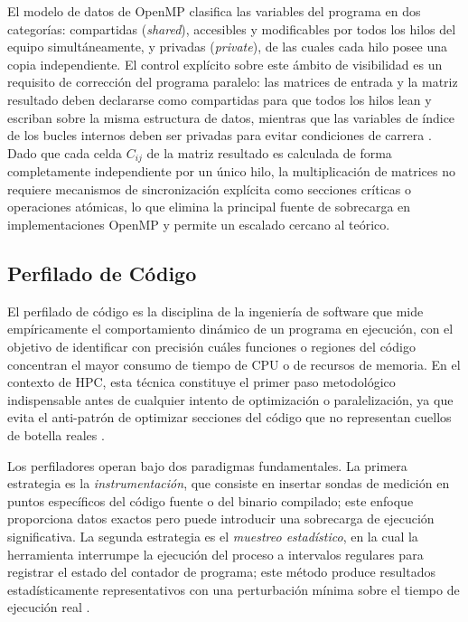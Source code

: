 El modelo de datos de OpenMP clasifica las variables del programa en dos categorías: compartidas
(\textit{shared}), accesibles y modificables por todos los hilos del equipo simultáneamente, y
privadas (\textit{private}), de las cuales cada hilo posee una copia independiente. El control
explícito sobre este ámbito de visibilidad es un requisito de corrección del programa paralelo:
las matrices de entrada y la matriz resultado deben declararse como compartidas para que todos
los hilos lean y escriban sobre la misma estructura de datos, mientras que las variables de
índice de los bucles internos deben ser privadas para evitar condiciones de carrera
\parencite{Chapman2008OpenMP}. Dado que cada celda \(C_{ij}\) de la matriz resultado es
calculada de forma completamente independiente por un único hilo, la multiplicación de
matrices no requiere mecanismos de sincronización explícita como secciones críticas o
operaciones atómicas, lo que elimina la principal fuente de sobrecarga en implementaciones
OpenMP y permite un escalado cercano al teórico.

\subsection{Perfilado de Código}
El perfilado de código es la disciplina de la ingeniería de software que mide empíricamente el
comportamiento dinámico de un programa en ejecución, con el objetivo de identificar con
precisión cuáles funciones o regiones del código concentran el mayor consumo de tiempo de
CPU o de recursos de memoria. En el contexto de HPC, esta técnica constituye el primer paso
metodológico indispensable antes de cualquier intento de optimización o paralelización, ya que
evita el anti-patrón de optimizar secciones del código que no representan cuellos de botella
reales \parencite{Hager2010HPC}.

Los perfiladores operan bajo dos paradigmas fundamentales. La primera estrategia es la
\textit{instrumentación}, que consiste en insertar sondas de medición en puntos específicos del
código fuente o del binario compilado; este enfoque proporciona datos exactos pero puede
introducir una sobrecarga de ejecución significativa. La segunda estrategia es el
\textit{muestreo estadístico}, en la cual la herramienta interrumpe la ejecución del proceso a
intervalos regulares para registrar el estado del contador de programa; este método produce
resultados estadísticamente representativos con una perturbación mínima sobre el tiempo de
ejecución real \parencite{Grama2003Introduction}.

